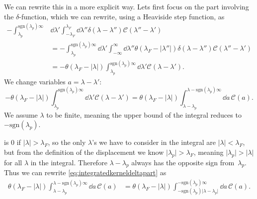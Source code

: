 \documentclass[11pt, a4paper,draft]{report} %
\newcommand{\kernel}{\mathcal{C}}
\begin{document}
We can rewrite this in a more explicit way.
Lets first focus on the part involving the \(\delta\)-function, which we can rewrite, using a Heaviside step function, as
\begin{align}
	- \int_{\lambda_p}^{\textrm{sgn}(\lambda_p)\infty} &\dd \lambda' \int_{-\lambda_F}^{\lambda_F} \dd  \lambda'' \delta(\lambda-\lambda'') \kernel(\lambda''-\lambda') \\
	&=- \int_{\lambda_p}^{\textrm{sgn}(\lambda_p)\infty} \dd \lambda' \int_{-\infty}^{\infty} \dd \lambda'' \theta(\lambda_F - \lvert \lambda'' \rvert)  \delta(\lambda-\lambda'') \kernel(\lambda''-\lambda')\\
	&= - \theta(\lambda_F - \lvert \lambda \rvert) \int_{\lambda_p}^{\textrm{sgn}(\lambda_p)\infty} \dd \lambda'     \kernel(\lambda-\lambda').
\end{align}
We change variables \(a=\lambda-\lambda'\):
\begin{equation}\label{eq:integratedkerneldeltapart}
	- \theta(\lambda_F - \lvert \lambda \rvert) \int_{\lambda_p}^{\textrm{sgn}(\lambda_p)\infty} \dd \lambda'     \kernel(\lambda-\lambda')=
	 \theta(\lambda_F - \lvert \lambda \rvert) \int_{\lambda-\lambda_p}^{\lambda - \textrm{sgn}(\lambda_p)\infty} \dd a\,\kernel(a).
\end{equation}
We assume \(\lambda\) to be finite, meaning the upper bound of the integral reduces to \(-\textrm{sgn}(\lambda_p)\).

 is 0 if \(\lvert \lambda\rvert > \lambda_F\), so the only \(\lambda\)'s we have to consider in the integral are \(\lvert\lambda\rvert< \lambda_F\), but from the definition of the displacement we know \(\lvert\lambda_p\rvert >\lambda_F\), meaning \(\lvert\lambda_p\rvert > \lvert\lambda\rvert\) for all \(\lambda\) in the integral.
Therefore \(\lambda-\lambda_p\) always has the opposite sign from~\(\lambda_p\).
Thus we can rewrite \cref{eq:integratedkerneldeltapart} as
\begin{align}
	\theta(\lambda_F - \lvert \lambda \rvert) \int_{\lambda-\lambda_p}^{\lambda - \textrm{sgn}(\lambda_p)\infty} \dd a\,\kernel(a) &=
	\theta(\lambda_F - \lvert \lambda \rvert) \int_{-\textrm{sgn}(\lambda_p)\lvert\lambda-\lambda_p\rvert}^{ - \textrm{sgn}(\lambda_p)\infty} \dd a\,\kernel(a).
\end{align}
\end{document}
